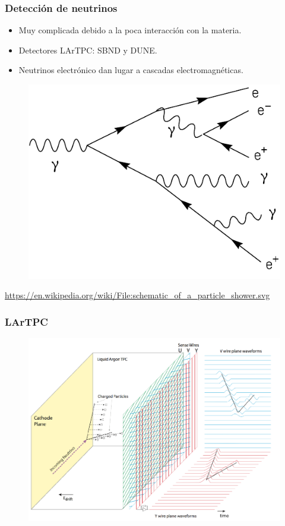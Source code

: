 \documentclass{beamer}
\begin{document}
\begin{frame}
  \frametitle{Detección de neutrinos}
  \begin{itemize}
    \item Muy complicada debido a la poca interacción con la materia.
    \item Detectores LArTPC: SBND y DUNE.
    \item Neutrinos electrónico dan lugar a cascadas electromagnéticas. 
  \end{itemize}
  \begin{figure}
    \centering
        \includegraphics[scale=0.5]{Schematic_of_a_particle_shower.pdf} 
  \end{figure}
  \url{https://en.wikipedia.org/wiki/File:schematic_of_a_particle_shower.svg}
\end{frame}
\begin{frame}
  \frametitle{LArTPC}
    \begin{figure}
      \centering
      \includegraphics[scale=0.5]{planos_sensado.PNG}
    \end{figure}
\end{frame}
\end{document}
